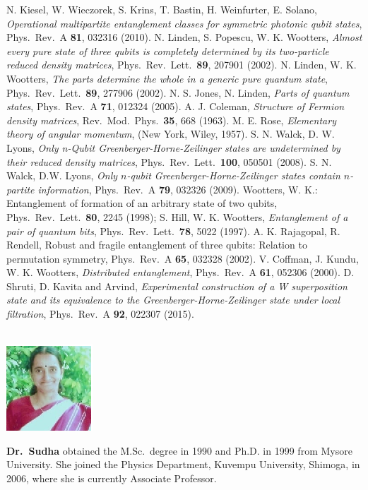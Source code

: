 \begin{thebibliography}{99}
 N. Kiesel, W. Wieczorek, S. Krins, T. Bastin, H. Weinfurter,  E. Solano, {\em Operational multipartite entanglement classes for symmetric photonic qubit states}, Phys.\ Rev.\ A {\bf 81}, 032316 (2010).
  N. Linden, S. Popescu, W. K. Wootters, {\em Almost every pure state of three qubits is completely determined by its two-particle reduced density matrices}, Phys.\ Rev.\ Lett.\  {\bf 89}, 207901 (2002).
 N. Linden, W. K.  Wootters, {\em The parts determine the whole in a generic pure quantum state}, Phys.\ Rev.\ Lett.\ {\bf 89}, 277906 (2002).
 N. S. Jones, N. Linden, {\em Parts of quantum states}, Phys.\ Rev.\ A {\bf 71}, 012324 (2005).
 A. J. Coleman, {\em Structure of Fermion density matrices}, Rev.\ Mod.\ Phys.\ {\bf 35}, 668 (1963). 
 M. E. Rose, {\em Elementary theory of angular momentum}, (New York, Wiley, 1957).  
 S. N. Walck, D. W. Lyons, {\em  Only n-Qubit Greenberger-Horne-Zeilinger states are undetermined by their reduced density matrices}, Phys.\  Rev.\ Lett.\ {\bf 100}, 050501 (2008).
 S. N. Walck, D.W. Lyons, {\em  Only $n$-qubit Greenberger-Horne-Zeilinger states contain $n$-partite information}, Phys.\ Rev.\ A {\bf 79}, 032326 (2009). 
  Wootters, W. K.: Entanglement of formation of an arbitrary state of two qubits, Phys.\ Rev.\ Lett.\ {\bf 80}, 2245 (1998); 
 S. Hill, W. K. Wootters,  {\em Entanglement of a pair of quantum bits}, Phys.\ Rev.\ Lett.\ {\bf 78},  5022 (1997).
  A. K. Rajagopal, R. Rendell, {\rm  Robust and fragile entanglement of three qubits: Relation to permutation symmetry}, Phys.\ Rev.\ A {\bf 65}, 032328 (2002). 
 V. Coffman, J. Kundu, W. K. Wootters, {\em Distributed entanglement}, Phys.\ Rev.\ A {\bf 61}, 052306 (2000).  
 D. Shruti, D. Kavita and Arvind, {\em Experimental construction of a W superposition state and its equivalence to the Greenberger-Horne-Zeilinger state under local filtration}, Phys.\ Rev.\ A {\bf 92}, 022307 (2015).  
\end{thebibliography}
\renewcommand{\thesection}{\arabic{section}}

\noindent
\begin{minipage}[t]{3cm}%
\phantom{i}\\[-1cm]%
\includegraphics[scale=1.7]{authorsphotos/Prof_A_R_Sudha.eps}
\end{minipage}
\begin{minipage}{6.5cm}
\textbf{Dr.\ Sudha} obtained the M.Sc.\ degree in 1990 and Ph.D. in 1999 from Mysore University. She joined the Physics Department, Kuvempu University, Shimoga, in 2006, where she is currently Associate Professor.
\end{minipage}

